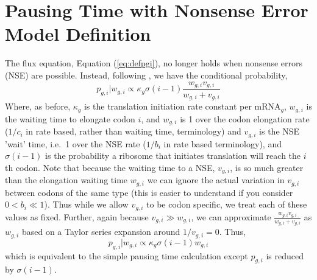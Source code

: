 \documentclass{article}
\newcommand{\waitTerm}{\ensuremath{w}\xspace}
\newcommand{\wgi}{\ensuremath{\waitTerm_{g,i}}\xspace}
\newcommand{\alphac}{\ensuremath{{\alpha_c}}\xspace}
\newcommand{\lambdacprime}{\ensuremath{{\lambda_c^\prime}}\xspace}
\newcommand{\nseTerm}{\ensuremath{v}\xspace}
\newcommand{\vgi}{\ensuremath{\nseTerm_{g,i}}\xspace}
\newcommand{\pgi}{\ensuremath{{p_{g,i}}}\xspace}
\newcommand{\ngc}{\ensuremath{{n_{g}^c}}\xspace}
\newcommand{\kappag}{\ensuremath{{\kappa_{g}}}\xspace}
\newcommand{\mRNAg}{mRNA$_g$\xspace}
\newcommand{\Ygc}{\ensuremath{{Y_{g}^c}}\xspace}
\begin{document}


\section*{Pausing Time with Nonsense Error Model Definition}
The flux equation, Equation (\ref{eq:defpgi}), no longer holds when nonsense errors (NSE) are possible.
Instead, following \citet{GilchristAndWagner06}, we have the conditional probability,
\begin{equation}
\label{eq:defpgiNse}
\pgi|\wgi \propto \kappag \sigma(i-1) \frac{\wgi \vgi}{\wgi + \vgi}
\end{equation} 
Where, as before, \kappag is the translation initiation rate constant per \mRNAg, \wgi is the waiting time to elongate codon $i$, and  \wgi is 1 over the codon elongation rate ($1/c_i$ in rate based, rather than waiting time, terminology) and \vgi is the NSE 'wait' time, i.e.~1 over the NSE rate ($1/b_i$ in rate based terminology), and $\sigma(i-1)$ is the probability a ribosome that initiates translation will reach the $i$th codon.
Note that because the waiting time to a NSE, \vgi, is so much greater than the elongation waiting time \wgi we can ignore the actual variation in \vgi between codons of the same type (this is easier to understand if you consider $0 < b_i \ll 1$).
Thus while we allow \vgi to be codon specific, we treat each of these values as fixed.
Further, again because $\vgi \gg \wgi$, we can approximate $\frac{\wgi \vgi}{\wgi + \vgi}$ as $\wgi$ based on a Taylor series expansion around $1/\vgi = 0 $.
Thus,
\begin{equation}
\label{eq:defpgiNseApprox}
\pgi|\wgi \propto \kappag \sigma(i-1) \wgi
\end{equation} 
which is equivalent to the simple pausing time calculation except $\pgi$ is reduced by $\sigma(i-1)$.
\end{document}
